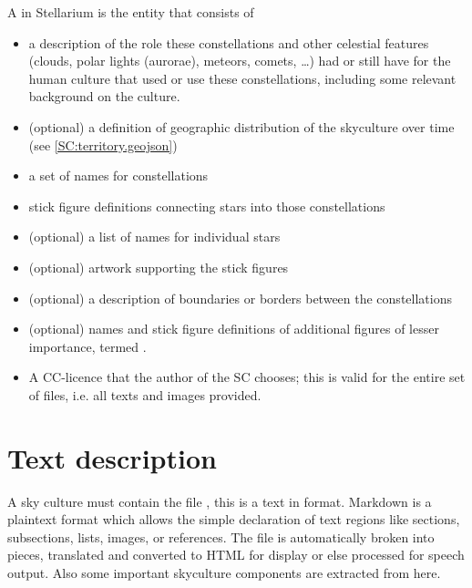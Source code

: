 A  in Stellarium is the entity that consists of 
\begin{itemize}
\item a description of the role these constellations and other celestial features (clouds, polar lights (aurorae), meteors, comets, \ldots) 
      had or still have for the human culture that used or use these constellations, including some relevant background on the culture.
\item (optional) a definition of geographic distribution of the skyculture over time (see \ref{SC:territory.geojson})
\item a set of names for constellations 
\item stick figure definitions connecting stars into those constellations
\item (optional) a list of names for individual stars
\item (optional) artwork supporting the stick figures
\item (optional) a description of boundaries or borders between the constellations
\item (optional) names and stick figure definitions of additional figures of lesser importance, termed .
\item A CC-licence that the author of the SC chooses; this is valid for the entire set of files, i.e. all texts and images provided.
\end{itemize}

\section{Text description}
\label{sec:skycultures:description}
\label{SC:description.md}


A sky culture must contain the file , this is a text in  format. 
Markdown is a plaintext format which allows the simple declaration of text regions like sections, subsections, lists, images, or references. 
The file is automatically broken into pieces, translated and converted to HTML for display or else processed for speech output. Also some important skyculture components are extracted from here.

